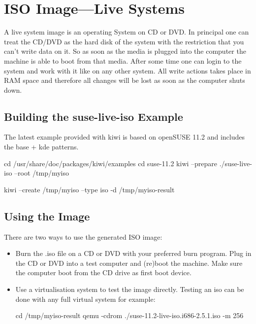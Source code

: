 \chapter{ISO Image---Live Systems}
\label{chapter:iso}
\minitoc

A live system image is an operating System on CD or DVD. In principal
one can treat the CD/DVD as the hard disk of the system with the
restriction that you can't write data on it. So as soon as the media
is plugged into the computer the machine is able to boot from that
media. After some time one can login to the system and work with it
like on any other system. All write actions takes place in RAM space
and therefore all changes will be lost as soon as the computer shuts
down.

\section{Building the suse-live-iso Example}

The latest example provided with kiwi is based on openSUSE 11.2 and
includes the base + kde patterns.

\begin{Command}{12cm}
cd /usr/share/doc/packages/kiwi/examples
cd suse-11.2
kiwi --prepare ./suse-live-iso --root /tmp/myiso

kiwi --create /tmp/myiso --type iso -d /tmp/myiso-result
\end{Command}

\section{Using the Image}

There are two ways to use the generated ISO image:
\begin{itemize}
\item Burn the .iso file on a CD or DVD with your preferred burn program.
      Plug in the CD or DVD into a test computer and (re)boot the machine.
      Make sure the computer boot from the CD drive as first boot device.
\item Use a virtualisation system to test the image directly. Testing an
      iso can be done with any full virtual system for example:

\begin{Command}{12cm}
cd /tmp/myiso-result
qemu -cdrom ./suse-11.2-live-iso.i686-2.5.1.iso -m 256
\end{Command}
\end{itemize}

